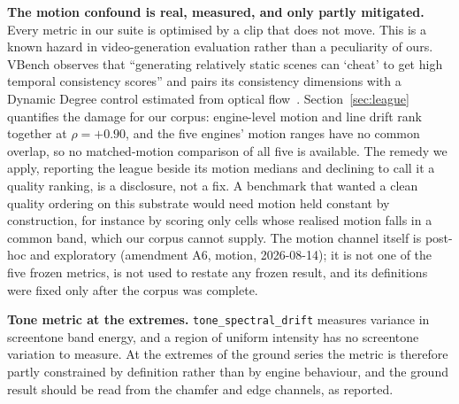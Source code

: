 \documentclass[11pt]{article}
\begin{document}
\textbf{The motion confound is real, measured, and only partly
mitigated.} Every metric in our suite is optimised by a clip that does not
move. This is a known hazard in video-generation evaluation rather than a
peculiarity of ours. VBench observes that ``generating relatively static
scenes can `cheat' to get high temporal consistency scores'' and pairs its
consistency dimensions with a Dynamic Degree control estimated from optical
flow~\cite{huang2023vbench}. Section~\ref{sec:league} quantifies the damage
for our corpus: engine-level motion and line drift rank together at
$\rho = +0.90$, and the five engines' motion ranges have no common overlap,
so no matched-motion comparison of all five is available. The remedy we apply, reporting the
league beside its motion medians and declining to call it a quality ranking,
is a disclosure, not a fix. A benchmark that wanted a clean quality ordering
on this substrate would need motion held constant by construction, for
instance by scoring only cells whose realised motion falls in a common band,
which our corpus cannot supply. The motion channel itself is post-hoc and
exploratory (amendment A6, motion, 2026-08-14); it is not one of the five frozen metrics, is not
used to restate any frozen result, and its definitions were fixed only after
the corpus was complete.

\textbf{Tone metric at the extremes.} \texttt{tone\_spectral\_drift} measures
variance in screentone band energy, and a region of uniform intensity has no
screentone variation to measure. At the extremes of the ground series the
metric is therefore partly constrained by definition rather than by engine
behaviour, and the ground result should be read from the chamfer and edge
channels, as reported.
\end{document}
